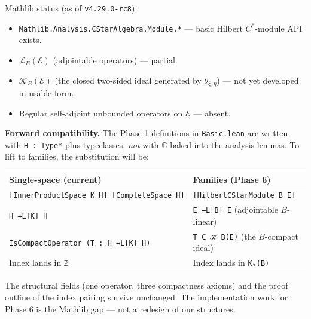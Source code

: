 \documentclass[
  11pt,
]{article}
\newcounter{none} %
\providecommand{\tightlist}{%
  \setlength{\itemsep}{0pt}\setlength{\parskip}{0pt}}
\begin{document}
Mathlib status (as of \texttt{v4.29.0-rc8}):

\begin{itemize}
\tightlist
\item
  \texttt{Mathlib.Analysis.CStarAlgebra.Module.*} --- basic Hilbert
  \(C^*\)-module API exists.
\item
  \(\mathcal{L}_B(\mathcal{E})\) (adjointable operators) --- partial.
\item
  \(\mathcal{K}_B(\mathcal{E})\) (the closed two-sided ideal generated
  by \(\theta_{\xi,\eta}\)) --- not yet developed in usable form.
\item
  Regular self-adjoint unbounded operators on \(\mathcal{E}\) ---
  absent.
\end{itemize}

\textbf{Forward compatibility.} The Phase 1 definitions in
\texttt{Basic.lean} are written with \texttt{H\ :\ Type*} plus
typeclasses, \emph{not} with \(\mathbb{C}\) baked into the analysis
lemmas. To lift to families, the substitution will be:

{\def\LTcaptype{none} %
\begin{longtable}[]{@{}
  >{\raggedright\arraybackslash}p{}
  >{\raggedright\arraybackslash}p{}@{}}
\toprule\noalign{}
\begin{minipage}[b]{\linewidth}\raggedright
Single-space (current)
\end{minipage} & \begin{minipage}[b]{\linewidth}\raggedright
Families (Phase 6)
\end{minipage} \\
\midrule\noalign{}
\endhead
\bottomrule\noalign{}
\endlastfoot
\texttt{{[}InnerProductSpace\ K\ H{]}\ {[}CompleteSpace\ H{]}} &
\texttt{{[}HilbertCStarModule\ B\ E{]}} \\
\texttt{H\ →L{[}K{]}\ H} & \texttt{E\ →L{[}B{]}\ E} (adjointable
\(B\)-linear) \\
\texttt{IsCompactOperator\ (T\ :\ H\ →L{[}K{]}\ H)} &
\texttt{T\ ∈\ 𝒦\_B(E)} (the \(B\)-compact ideal) \\
Index lands in \texttt{ℤ} & Index lands in \texttt{K₀(B)} \\
\end{longtable}
}

The structural fields (one operator, three compactness axioms) and the
proof outline of the index pairing survive unchanged. The implementation
work for Phase 6 is the Mathlib gap --- not a redesign of our
structures.
\end{document}
